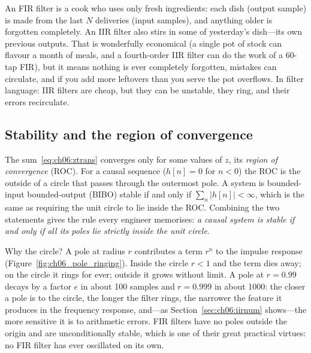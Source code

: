
\begin{analogy}
An FIR filter is a cook who uses only fresh ingredients: each dish (output sample) is made from
the last $N$ deliveries (input samples), and anything older is forgotten completely. An IIR filter
also stirs in some of yesterday's dish---its own previous outputs. That is wonderfully economical
(a single pot of stock can flavour a month of meals, and a fourth-order IIR filter can do the work
of a 60-tap FIR), but it means nothing is ever completely forgotten, mistakes can circulate, and
if you add more leftovers than you serve the pot overflows. In filter language: IIR filters are
cheap, but they can be unstable, they ring, and their errors recirculate.
\end{analogy}

\subsection{Stability and the region of convergence}

The sum~\eqref{eq:ch06:ztrans} converges only for some values of $z$, its \emph{region of
convergence} (ROC). For a causal sequence ($h[n]=0$ for $n<0$) the ROC is the outside of a circle
that passes through the outermost pole. A system is bounded-input bounded-output (BIBO) stable if
and only if $\sum_n|h[n]|<\infty$, which is the same as requiring the unit circle to lie inside the
ROC. Combining the two statements gives the rule every engineer memorises: \emph{a causal system
is stable if and only if all its poles lie strictly inside the unit circle}.


Why the circle? A pole at radius $r$ contributes a term $r^n$ to the impulse response
(Figure~\ref{fig:ch06_pole_ringing}). Inside the circle $r<1$ and the term dies away; on the circle
it rings for ever; outside it grows without limit. A pole at $r=0.99$ decays by a factor $e$ in
about 100 samples and $r=0.999$ in about 1000: the closer a pole is to the circle, the longer the
filter rings, the narrower the feature it produces in the frequency response, and---as
Section~\ref{sec:ch06:iirnum} shows---the more sensitive it is to arithmetic errors. FIR filters
have no poles outside the origin and are unconditionally stable, which is one of their great
practical virtues: no FIR filter has ever oscillated on its own.

